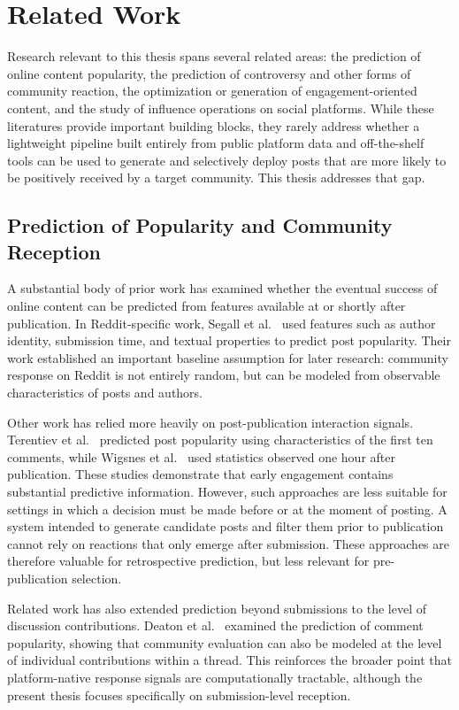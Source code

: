 \chapter{Related Work}
\label{chap:relatedwork}

Research relevant to this thesis spans several related areas: the prediction of online content popularity, the prediction of controversy and other forms of community reaction, the optimization or generation of engagement-oriented content, and the study of influence operations on social platforms. While these literatures provide important building blocks, they rarely address whether a lightweight pipeline built entirely from public platform data and off-the-shelf tools can be used to generate and selectively deploy posts that are more likely to be positively received by a target community. This thesis addresses that gap.

\section{Prediction of Popularity and Community Reception}

A substantial body of prior work has examined whether the eventual success of online content can be predicted from features available at or shortly after publication. In Reddit-specific work, Segall et al.~\cite{segall2012predicting} used features such as author identity, submission time, and textual properties to predict post popularity. Their work established an important baseline assumption for later research: community response on Reddit is not entirely random, but can be modeled from observable characteristics of posts and authors.

Other work has relied more heavily on post-publication interaction signals. Terentiev et al.~\cite{terentiev2014predicting} predicted post popularity using characteristics of the first ten comments, while Wigsnes et al.~\cite{wigsnes2019predicting} used statistics observed one hour after publication. These studies demonstrate that early engagement contains substantial predictive information. However, such approaches are less suitable for settings in which a decision must be made before or at the moment of posting. A system intended to generate candidate posts and filter them prior to publication cannot rely on reactions that only emerge after submission. These approaches are therefore valuable for retrospective prediction, but less relevant for pre-publication selection.

Related work has also extended prediction beyond submissions to the level of discussion contributions. Deaton et al.~\cite{deaton2017using} examined the prediction of comment popularity, showing that community evaluation can also be modeled at the level of individual contributions within a thread. This reinforces the broader point that platform-native response signals are computationally tractable, although the present thesis focuses specifically on submission-level reception.

